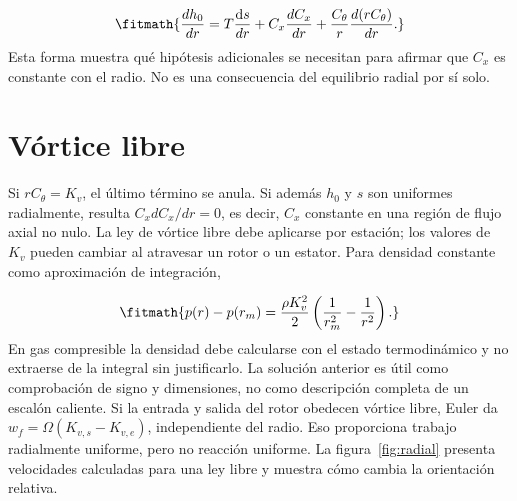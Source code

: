 \documentclass[10pt,openany]{book}
\begin{document}
\[
\fitmath{\frac{dh_0}{dr}=T\frac{\mathrm{d}s}{dr}+C_x\frac{dC_x}{dr}+\frac{C_\theta}{r}\frac{d(rC_\theta)}{dr}.}
\]
Esta forma muestra qué hipótesis adicionales se necesitan para afirmar que \(C_x\) es constante con el radio. No es una consecuencia del equilibrio radial por sí solo.

\section{Vórtice libre}

Si \(rC_\theta=K_v\), el último término se anula. Si además \(h_0\) y \(s\) son uniformes radialmente, resulta \(C_xdC_x/dr=0\), es decir, \(C_x\) constante en una región de flujo axial no nulo. La ley de vórtice libre debe aplicarse por estación; los valores de \(K_v\) pueden cambiar al atravesar un rotor o un estator.
Para densidad constante como aproximación de integración,

\[
\fitmath{p(r)-p(r_m)=\frac{\rho K_v^2}{2}\left(\frac1{r_m^2}-\frac1{r^2}\right).}
\]
En gas compresible la densidad debe calcularse con el estado termodinámico y no extraerse de la integral sin justificarlo. La solución anterior es útil como comprobación de signo y dimensiones, no como descripción completa de un escalón caliente.
Si la entrada y salida del rotor obedecen vórtice libre, Euler da \(w_f=\Omega(K_{v,s}-K_{v,e})\), independiente del radio. Eso proporciona trabajo radialmente uniforme, pero no reacción uniforme. La figura~\ref{fig:radial} presenta velocidades calculadas para una ley libre y muestra cómo cambia la orientación relativa.
\end{document}
